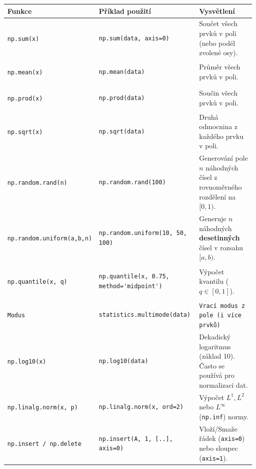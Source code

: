 \documentclass[a4paper, 11pt]{article}
\newenvironment{funkcedict}
{%
  \begingroup
  \renewcommand{\arraystretch}{1.4}%
  \lstset{basicstyle=\ttfamily\small, columns=fullflexible}%
  \setlength{\tabcolsep}{4pt}%
  \begin{tabular}{p{0.19\textwidth} p{0.38\textwidth} p{0.30\textwidth}}
  \textbf{Funkce} & \textbf{Příklad použití} & \textbf{Vysvětlení} \\
  \midrule
}
{%
  \end{tabular}%
  \endgroup
}
\begin{document}
\begin{funkcedict}
	\texttt{np.sum(x)} &
	\begin{lstlisting}
np.sum(data, axis=0)
	\end{lstlisting}
	& Součet všech prvků v poli (nebo podél zvolené osy). \\
	\texttt{np.mean(x)} &
	\begin{lstlisting}
np.mean(data)
	\end{lstlisting}
	& Průměr všech prvků v poli. \\
	\texttt{np.prod(x)} &
	\begin{lstlisting}
np.prod(data)
	\end{lstlisting}
	& Součin všech prvků v poli. \\
	\texttt{np.sqrt(x)} &
	\begin{lstlisting}
np.sqrt(data)
	\end{lstlisting}
	& Druhá odmocnina z každého prvku v poli. \\
	\texttt{np.random.rand(n)} &
	\begin{lstlisting}
np.random.rand(100)
	\end{lstlisting}
	& Generování pole $n$ náhodných čísel z rovnoměrného rozdělení na $[0, 1)$. \\
		\texttt{np.random.\allowbreak uniform(a,b,n)} &
		\begin{lstlisting}
np.random.uniform(10, 50, 100)
		\end{lstlisting}
		& Generuje $n$ náhodných \textbf{desetinných} čísel v rozsahu $[a, b)$. \\
			\texttt{np.quantile(x, q)} &
			\begin{lstlisting}
np.quantile(x, 0.75, method='midpoint')
			\end{lstlisting}
			& Výpočet kvantilu ($q \in [0, 1]$). \\
			\texttt{Modus} &
			\begin{lstlisting}
statistics.multimode(data)
			\end{lstlisting}
			& \texttt{Vrací modus z pole (i více prvků)} \\
			\texttt{np.log10(x)} &
			\begin{lstlisting}
np.log10(data)
			\end{lstlisting}
			& Dekadický logaritmus (základ 10). Často se používá pro normalizaci dat. \\
			\texttt{np.linalg.norm(x, p)} &
			\begin{lstlisting}
np.linalg.norm(x, ord=2)
			\end{lstlisting}
			& Výpočet $L^1, L^2$ nebo $L^\infty$ (\texttt{np.inf}) normy. \\
			\texttt{np.insert / np.delete} &
			\begin{lstlisting}
np.insert(A, 1, [..], axis=0)
			\end{lstlisting}
			& Vloží/Smaže řádek (\texttt{axis=0}) nebo sloupec (\texttt{axis=1}). \\
			\end{funkcedict}
\end{document}

